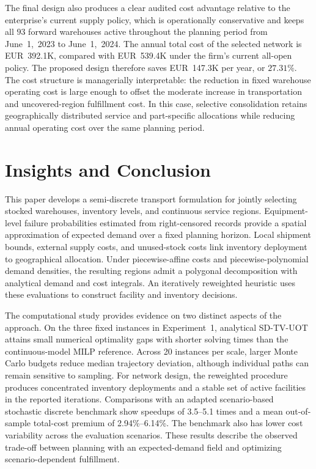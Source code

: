\documentclass[a4paper,fleqn]{cas-sc}
\theoremstyle{remark}
\theoremstyle{plain}
\begin{document}
The final design also produces a clear audited cost advantage relative to the enterprise's current supply policy, which is operationally conservative and keeps all $93$ forward warehouses active throughout the planning period from June~1,~2023 to June~1,~2024. The annual total cost of the selected network is EUR~392.1K, compared with EUR~539.4K under the firm's current all-open policy. The proposed design therefore saves EUR~147.3K per year, or $27.31\%$. The cost structure is managerially interpretable: the reduction in fixed warehouse operating cost is large enough to offset the moderate increase in transportation and uncovered-region fulfillment cost. In this case, selective consolidation retains geographically distributed service and part-specific allocations while reducing annual operating cost over the same planning period.

\section{Insights and Conclusion}\label{sec:conclusion}

This paper develops a semi-discrete transport formulation for jointly selecting stocked warehouses, inventory levels, and continuous service regions. Equipment-level failure probabilities estimated from right-censored records provide a spatial approximation of expected demand over a fixed planning horizon. Local shipment bounds, external supply costs, and unused-stock costs link inventory deployment to geographical allocation. Under piecewise-affine costs and piecewise-polynomial demand densities, the resulting regions admit a polygonal decomposition with analytical demand and cost integrals. An iteratively reweighted heuristic uses these evaluations to construct facility and inventory decisions.

The computational study provides evidence on two distinct aspects of the approach. On the three fixed instances in Experiment~1, analytical SD-TV-UOT attains small numerical optimality gaps with shorter solving times than the continuous-model MILP reference. Across 20 instances per scale, larger Monte Carlo budgets reduce median trajectory deviation, although individual paths can remain sensitive to sampling. For network design, the reweighted procedure produces concentrated inventory deployments and a stable set of active facilities in the reported iterations. Comparisons with an adapted scenario-based stochastic discrete benchmark show speedups of 3.5--5.1 times and a mean out-of-sample total-cost premium of 2.94\%--6.14\%. The benchmark also has lower cost variability across the evaluation scenarios. These results describe the observed trade-off between planning with an expected-demand field and optimizing scenario-dependent fulfillment.
\end{document}
